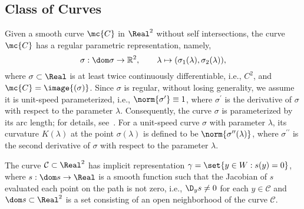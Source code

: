 \subsection{Class of Curves}
\label{sec:curves}
Given a smooth curve $\mc{C}$ in $\Real^2$ without self intersections, the curve $\mc{C}$ has a regular parametric representation, namely,
\begin{equation}
\label{eq:general_path}
\sigma : \dom \sigma\rightarrow\mathbb{R}^{2}, \qquad
\lambda\mapsto{\left(\sigma_{1}(\lambda), \sigma_{2}(\lambda)\right)},
\end{equation}
where $\sigma\subset \Real$ is at least twice continuously differentiable, i.e., $C^2$, and $\mc{C}= \image{(\sigma)}$.
Since $\sigma$ is regular, without losing generality, we assume it is
unit-speed parameterized, i.e., $\norm{\sigma^\prime} \equiv 1$, where $\sigma^\prime$ is the derivative of $\sigma$ with respect to the parameter $\lambda$. Consequently, the curve $\sigma$ is parameterized by its arc length; for details, see~\cite{Pres2010,AkhNieWas2015}.  For a unit-speed curve $\sigma$ with parameter $\lambda$, its curvature $K(\lambda)$ at the point $\sigma(\lambda)$ is defined to be  $\norm{\sigma^{\prime\prime}(\lambda)}$,  where $\sigma^{\prime\prime}$ is the second derivative of $\sigma$ with respect to the parameter $\lambda$.
\begin{assumption}
  The curve $\mathcal{C}\subset \Real^2$ has implicit representation $
  \gamma = \set{y \in W : s(y) = 0}$, 
  where $s: \dom s \to \Real$ is a smooth function such that the {Jacobian of $s$ evaluated  each point on the path is not zero, i.e., $\D_y s \neq 0$
  for each $y \in \mathcal{C}$} and $\dom s \mynn{\subset}
  \Real^2$ is a set {consisting of an open neighborhood of the curve $\mathcal{C}$}.  
\label{ass:implicit}
\end{assumption}

